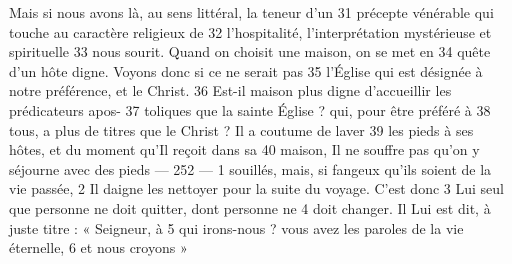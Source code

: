 Mais si nous avons là, au sens littéral, la teneur d'un	 
31	 	précepte vénérable qui touche au caractère religieux de	 
32	 	l'hospitalité, l'interprétation mystérieuse et spirituelle	 
33	 	nous sourit. Quand on choisit une maison, on se met en	 
34	 	quête d'un hôte digne. Voyons donc si ce ne serait pas	 
35	 	l'Église qui est désignée à notre préférence, et le Christ.	 
36	 	Est-il maison plus digne d'accueillir les prédicateurs apos-	 
37	 	toliques que la sainte Église ? qui, pour être préféré à	 
38	 	tous, a plus de titres que le Christ ? Il a coutume de laver	 
39	 	les pieds à ses hôtes, et du moment qu'Il reçoit dans sa	 
40	 	maison, Il ne souffre pas qu'on y séjourne avec des pieds	 
 	--- 252 ---	 
1	 	souillés, mais, si fangeux qu'ils soient de la vie passée,	 
2	 	Il daigne les nettoyer pour la suite du voyage. C'est donc	 
3	 	Lui seul que personne ne doit quitter, dont personne ne	 
4	 	doit changer. Il Lui est dit, à juste titre : « Seigneur, à	 
5	 	qui irons-nous ? vous avez les paroles de la vie éternelle,	 
6	 	et nous croyons »
